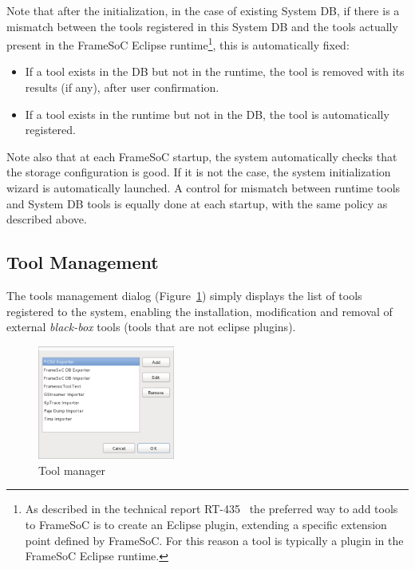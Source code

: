 \documentclass[twoside]{article}
\begin{document}
\begin{sloppypar}
Note that after the initialization, in the case of existing System DB, if there is a mismatch between the tools registered in this System DB and the tools actually present in the FrameSoC Eclipse runtime\footnote{As described in the technical report RT-435~\cite{pagano:hal-00830008} the preferred way to add tools to FrameSoC is to create an Eclipse plugin, extending a specific extension point defined by FrameSoC. For this reason a tool is typically a plugin in the FrameSoC Eclipse runtime.}, this is automatically fixed:
\begin{itemize}
 \item If a tool exists in the DB but not in the runtime, the tool is removed with its results (if any), after user confirmation.
 \item If a tool exists in the runtime but not in the DB, the tool is automatically registered.
\end{itemize}
Note also that at each FrameSoC startup, the system automatically checks that the storage configuration is good. 
If it is not the case, the system initialization wizard is automatically launched.
A control for mismatch between runtime tools and System DB tools is equally done at each startup, with the same policy as described above.

\subsection{Tool Management}
\label{subsec:tools}

The tools management dialog (Figure~\ref{fig:manage_tools}) simply displays the list of tools registered to the system, 
enabling the installation, modification and removal of external \emph{black-box} tools (tools that are not eclipse plugins).

\begin{figure}[h!]
  \centering
    \includegraphics[width=0.4\textwidth]{images/manage_tools.png}
  \caption{Tool manager}
  \label{fig:manage_tools}
\end{figure}


\end{sloppypar}
\end{document}

